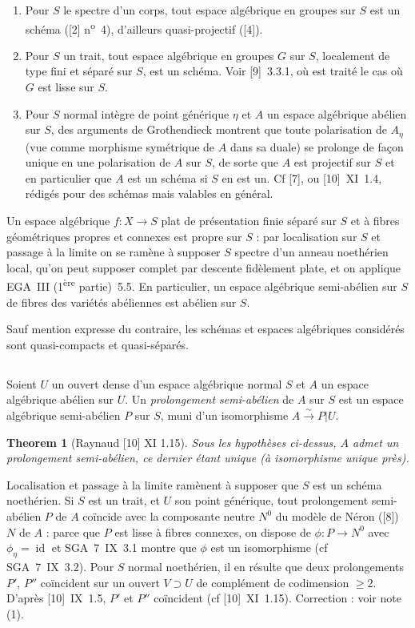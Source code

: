 \documentclass[12pt,a4paper]{article}
\theoremstyle{plain}
\newtheorem{theorem}{Theorem}[section]
\theoremstyle{definition}
\theoremstyle{remark}
\DeclareMathOperator{\id}{id}
\begin{document}
\begin{enumerate}[label=(\alph*)]
\item Pour $S$ le spectre d'un corps, tout espace algébrique en groupes sur $S$ est un schéma ([2] n\textsuperscript{o}~4), d'ailleurs quasi-projectif ([4]).
\item Pour $S$ un trait, tout espace algébrique en groupes $G$ sur $S$, localement de type fini et séparé sur $S$, est un schéma. Voir [9]~3.3.1, où est traité le cas où $G$ est lisse sur $S$.
\item Pour $S$ normal intègre de point générique $\eta$ et $A$ un espace algébrique abélien sur $S$, des arguments de Grothendieck montrent que toute polarisation de $A_\eta$ (vue comme morphisme symétrique de $A$ dans sa duale) se prolonge de façon unique en une polarisation de $A$ sur $S$, de sorte que $A$ est projectif sur $S$ et en particulier que $A$ est un schéma si $S$ en est un. Cf [7], ou [10]~XI~1.4, rédigés pour des schémas mais valables en général.
\end{enumerate}

Un espace algébrique $f : X \to S$ plat de présentation finie séparé sur $S$ et à fibres géométriques propres et connexes est propre sur $S$ : par localisation sur $S$ et passage à la limite on se ramène à supposer $S$ spectre d'un anneau noethérien local, qu'on peut supposer complet par descente fidèlement plate, et on applique EGA~III (1\textsuperscript{ère} partie)~5.5. En particulier, un espace algébrique semi-abélien sur $S$ de fibres des variétés abéliennes est abélien sur $S$.

Sauf mention expresse du contraire, les schémas et espaces algébriques considérés sont quasi-compacts et quasi-séparés.

\subsection{} Soient $U$ un ouvert dense d'un espace algébrique normal $S$ et $A$ un espace algébrique abélien sur $U$. Un \emph{prolongement semi-abélien} de $A$ sur $S$ est un espace algébrique semi-abélien $P$ sur $S$, muni d'un isomorphisme $A \xrightarrow{\sim} P|U$.

\begin{theorem}[Raynaud {[10] XI 1.15}]
Sous les hypothèses ci-dessus, $A$ admet un prolongement semi-abélien, ce dernier étant unique (à isomorphisme unique près).
\end{theorem}

Localisation et passage à la limite ramènent à supposer que $S$ est un schéma noethérien. Si $S$ est un trait, et $U$ son point générique, tout prolongement semi-abélien $P$ de $A$ coïncide avec la composante neutre $N^0$ du modèle de Néron ([8]) $N$ de $A$ : parce que $P$ est lisse à fibres connexes, on dispose de $\phi : P \to N^0$ avec $\phi_\eta = \id$ et SGA~7~IX~3.1 montre que $\phi$ est un isomorphisme (cf SGA~7~IX~3.2). Pour $S$ normal noethérien, il en résulte que deux prolongements $P'$, $P''$ coïncident sur un ouvert $V \supset U$ de complément de codimension $\geq 2$. D'après [10]~IX~1.5, $P'$ et $P''$ coïncident (cf [10]~XI~1.15). Correction : voir note (1).
\end{document}
